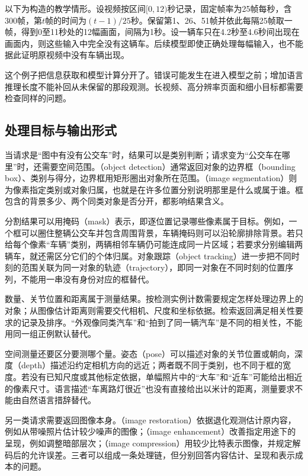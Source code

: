 \begin{example}[采样之后还能看见什么]
  \label{ex:vision-overview-sampling}
  以下为构造的教学情形。设视频按区间$[0,12)$秒记录，固定帧率为25帧每秒，含300帧，第$t$帧的时间为$(t-1)/25$秒。保留第1、26、51帧并依此每隔25帧取一帧，得到0至11秒处的12幅画面，间隔为1秒。设一辆车只在4.2秒至4.6秒间出现在画面内，则这些输入中完全没有这辆车。后续模型即使正确处理每幅输入，也不能据此证明原视频中没有车辆出现。
\end{example}

这个例子把信息获取和模型计算分开了。错误可能发生在进入模型之前；增加语言推理长度不能补回从未保留的那段观测。长视频、高分辨率页面和细小目标都需要检查同样的问题。

\subsection{处理目标与输出形式}
\label{sec:vision-overview-outputs}

当请求是“图中有没有公交车”时，结果可以是类别判断；请求变为“公交车在哪里”时，还需要空间范围。（object detection）通常返回对象的边界框（bounding box）、类别与得分，边界框用矩形圈出对象所在范围。（image segmentation）则为像素指定类别或对象归属，也就是在许多位置分别说明那里是什么或属于谁。框包含的背景多少、两个同类对象是否分开，都影响结果含义。

分割结果可以用掩码（mask）表示，即逐位置记录哪些像素属于目标。例如，一个框可以圈住整辆公交车并包含周围背景，车辆掩码则可以沿轮廓排除背景。若只给每个像素“车辆”类别，两辆相邻车辆仍可能连成同一片区域；若要求分别编辑两辆车，就还需区分它们的个体归属。对象跟踪（object tracking）进一步把不同时刻的范围关联为同一对象的轨迹（trajectory），即同一对象在不同时刻的位置序列，不能用一串没有身份对应的框替代。

数量、关节位置和距离属于测量结果。按检测实例计数需要规定怎样处理边界上的对象；从图像估计距离则需要交代相机、尺度和坐标依据。检索返回满足相关性要求的记录及排序。“外观像同类汽车”和“拍到了同一辆汽车”是不同的相关性，不能用同一组正例默认替代。

空间测量还要区分要测哪个量。姿态（pose）可以描述对象的关节位置或朝向，深度（depth）描述沿约定相机方向的远近；两者既不同于类别，也不同于框的宽度。若没有已知尺度或其他标定依据，单幅照片中的“大车”和“近车”可能给出相近的像素尺寸。语言描述“车离路灯很近”也没有直接给出以米计的距离，测量要求不能由自然语言措辞替代。

另一类请求需要返回图像本身。（image restoration）依据退化观测估计原内容，例如从带噪照片估计较少噪声的图像；（image enhancement）改善指定用途下的呈现，例如调整暗部层次；（image compression）用较少比特表示图像，并规定解码后的允许误差。三者可以组成一条处理链，但分别回答内容估计、呈现和表示成本的问题。

